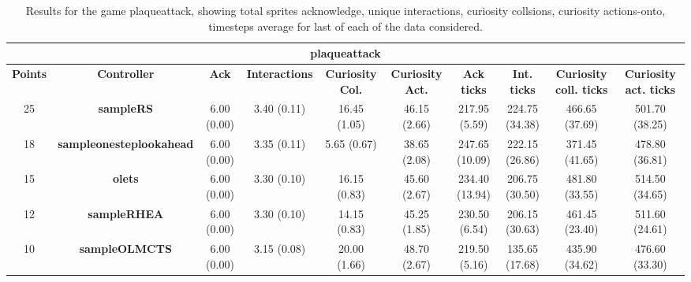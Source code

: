 \begin{table*}[!t]
\begin{center}
\begin{adjustbox}{width=1\textwidth}
\begin{tabular}{|c|c|c|c|c|c|c|c|c|c|}
\multicolumn{10}{c}{\textbf{plaqueattack}}\\
\hline
\textbf{Points} & \textbf{Controller} & \textbf{Ack} & \textbf{Interactions} & \textbf{Curiosity Col.} & \textbf{Curiosity Act.} & \textbf{Ack ticks} & \textbf{Int. ticks} & \textbf{Curiosity coll. ticks} & \textbf{Curiosity act. ticks}\\
\hline
25 & \textbf{sampleRS} & 6.00 (0.00) & 3.40 (0.11) & 16.45 (1.05) & 46.15 (2.66) & 217.95 (5.59) & 224.75 (34.38) & 466.65 (37.69) & 501.70 (38.25)
 \\
\hline
18 & \textbf{sampleonesteplookahead} & 6.00 (0.00) & 3.35 (0.11) & 5.65 (0.67) & 38.65 (2.08) & 247.65 (10.09) & 222.15 (26.86) & 371.45 (41.65) & 478.80 (36.81)
 \\
\hline
15 & \textbf{olets} & 6.00 (0.00) & 3.30 (0.10) & 16.15 (0.83) & 45.60 (2.67) & 234.40 (13.94) & 206.75 (30.50) & 481.80 (33.55) & 514.50 (34.65)
 \\
\hline
12 & \textbf{sampleRHEA} & 6.00 (0.00) & 3.30 (0.10) & 14.15 (0.83) & 45.25 (1.85) & 230.50 (6.54) & 206.15 (30.63) & 461.45 (23.40) & 511.60 (24.61)
 \\
\hline
10 & \textbf{sampleOLMCTS} & 6.00 (0.00) & 3.15 (0.08) & 20.00 (1.66) & 48.70 (2.67) & 219.50 (5.16) & 135.65 (17.68) & 435.90 (34.62) & 476.60 (33.30)
 \\
\hline
\end{tabular}
\end{adjustbox}
\caption{Results for the game plaqueattack, showing total sprites acknowledge, unique interactions, curiosity collsions, curiosity actions-onto, timesteps average for last of each of the data considered.}
\label{tab:weights}
\end{center}
\end{table*}
